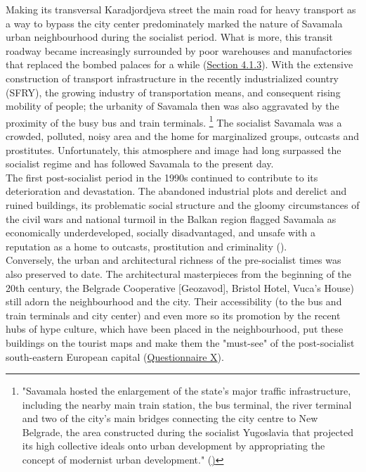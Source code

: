\documentclass[11pt]{report}
\begin{document}
Making its transversal Karadjordjeva street the main road for heavy transport as a way to bypass the city center predominately marked the nature of Savamala urban neighbourhood during the socialist period.
What is more, this transit roadway became increasingly surrounded by poor warehouses and manufactories that replaced the bombed palaces for a while (\href{Section 4.1.3}{Section 4.1.3}). 
With the extensive construction of transport infrastructure in the recently industrialized country (SFRY), the growing  industry of transportation means, and consequent rising mobility of people; the urbanity of Savamala then was also aggravated by the proximity of the busy bus and train terminals.
\footnote{"Savamala hosted the enlargement of the state’s major traffic infrastructure, including the nearby main
train station, the bus terminal, the river terminal and two of the city’s main bridges connecting the city centre to New Belgrade, the area constructed during the socialist Yugoslavia that projected its high collective ideals onto urban development by appropriating the concept of modernist urban development." (\href{ref}{\citealt{cvetinovic_engine_2013})}}
The socialist Savamala was a crowded, polluted, noisy area and the home for marginalized groups, outcasts and prostitutes.
Unfortunately, this atmosphere and image had long surpassed the socialist regime and has followed Savamala to the present day.
\\

The first post-socialist period in the 1990s continued to contribute to its deterioration and devastation. The abandoned industrial plots and derelict and ruined buildings, its problematic social structure and the gloomy circumstances of the  civil wars and national turmoil in the Balkan region flagged Savamala as economically underdeveloped, socially disadvantaged, and unsafe with a reputation as a home to outcasts, prostitution and criminality (\href{ref}{\citealt{cvetinovic_engine_2013}}).
\\

Conversely, the urban and architectural richness of the pre-socialist times was also preserved to date. The architectural masterpieces from the beginning of the 20th century, the Belgrade Cooperative [Geozavod], Bristol Hotel, Vuca’s House) still adorn the neighbourhood and the city. Their accessibility (to the bus and train terminals and city center) and even more so its promotion by the recent hubs of hype culture, which have been placed in the neighbourhood, put these buildings on the tourist maps and make them the "must-see" of the post-socialist south-eastern European capital (\href{Questionnaire Experts Savamala}{Questionnaire X}).
\\
\end{document}
